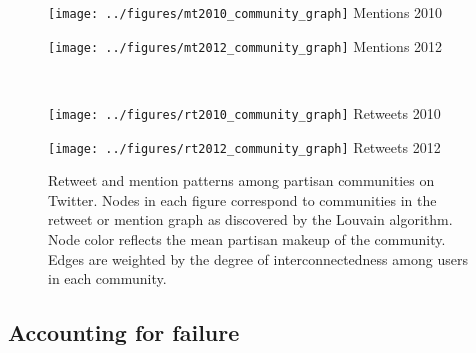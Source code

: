 \documentclass{article}
\begin{document}
\begin{figure*}[ht]
  \centering
  \begin{minipage}[h]{0.45\linewidth}
    \begin{center}
      \texttt{[image: ../figures/mt2010\_community\_graph]}
      Mentions 2010
    \end{center}

  \end{minipage}
  \begin{minipage}[h]{0.45\linewidth}
    \begin{center}
      \texttt{[image: ../figures/mt2012\_community\_graph]}
      Mentions 2012
    \end{center}
  \end{minipage}\\
  \begin{minipage}[h]{0.45\linewidth}
    \begin{center}
      \texttt{[image: ../figures/rt2010\_community\_graph]}
      Retweets 2010
    \end{center}
  \end{minipage}
  \begin{minipage}[h]{0.45\linewidth}
    \begin{center}
      \texttt{[image: ../figures/rt2012\_community\_graph]}
      Retweets 2012
    \end{center}
  \end{minipage}
\caption{Retweet and mention patterns among partisan communities on
  Twitter. Nodes in each figure correspond to communities in the
  retweet or mention graph as discovered by the Louvain
  algorithm. Node color reflects the mean partisan makeup of the
  community. Edges are weighted by the degree of interconnectedness
  among users in each community.}
\label{}
\end{figure*}



\subsection{Accounting for failure}
\label{sec:accounting-failure-1}
\end{document}
